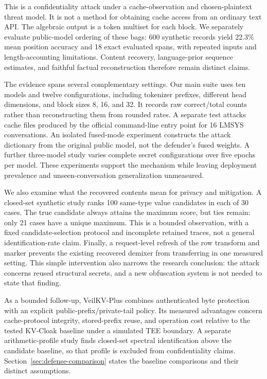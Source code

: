 This is a confidentiality attack under a cache-observation and chosen-plaintext threat model. It is not a method for obtaining cache access from an ordinary text API. The algebraic output is a token multiset for each block. We separately evaluate public-model ordering of these bags: 600 synthetic records yield 22.3\% mean position accuracy and 18 exact evaluated spans, with repeated inputs and length-accounting limitations. Content recovery, language-prior sequence estimates, and faithful factual reconstruction therefore remain distinct claims.

The evidence spans several complementary settings. Our main suite uses ten models and twelve configurations, including tokenizer prefixes, different head dimensions, and block sizes 8, 16, and 32. It records raw correct/total counts rather than reconstructing them from rounded rates. A separate test attacks cache files produced by the official command-line entry point for 16 LMSYS conversations. An isolated fused-mode experiment constructs the attack dictionary from the original public model, not the defender's fused weights. A further three-model study varies complete secret configurations over five epochs per model. These experiments support the mechanism while leaving deployment prevalence and unseen-conversation generalization unmeasured.

We also examine what the recovered contents mean for privacy and mitigation. A closed-set synthetic study ranks 100 same-type value candidates in each of 30 cases. The true candidate always attains the maximum score, but ties remain: only 21 cases have a unique maximum. This is a bounded observation, with a fixed candidate-selection protocol and incomplete retained traces, not a general identification-rate claim. Finally, a request-level refresh of the row transform and marker prevents the existing recovered demixer from transferring in one measured setting. This simple intervention also narrows the research conclusion: the attack concerns reused structural secrets, and a new obfuscation system is not needed to state that finding.

As a bounded follow-up, VeilKV-Plus combines authenticated byte protection with an explicit public-prefix/private-tail policy. Its measured advantages concern cache-protocol integrity, stored-prefix reuse, and operation cost relative to the tested KV-Cloak baseline under a simulated TEE boundary. A separate arithmetic-profile study finds closed-set spectral identification above the candidate baseline, so that profile is excluded from confidentiality claims. Section~\ref{sec:defense-comparison} states the baseline comparisons and their distinct assumptions.

